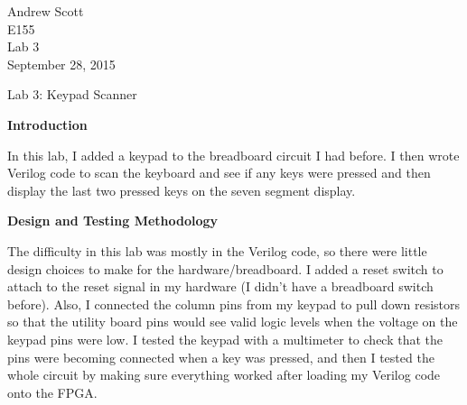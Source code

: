 \documentclass[11pt,letterpaper]{article}
\begin{document}
\begin{flushright}
Andrew Scott\\
E155\\
Lab 3\\
September 28, 2015
\end{flushright}

\begin{center}
Lab 3: Keypad Scanner
\end{center}

\noindent\textbf{Introduction}

In this lab, I added a keypad to the breadboard circuit I had before. I then wrote Verilog code to scan the keyboard and see if any keys were pressed and then display the last two pressed keys on the seven segment display.

\noindent\textbf{Design and Testing Methodology}

The difficulty in this lab was mostly in the Verilog code, so there were little design choices to make for the hardware/breadboard. I added a reset switch to attach to the reset signal in my hardware (I didn't have a breadboard switch before). Also, I connected the column pins from my keypad to pull down resistors so that the utility board pins would see valid logic levels when the voltage on the keypad pins were low. I tested the keypad with a multimeter to check that the pins were becoming connected when a key was pressed, and then I tested the whole circuit by making sure everything worked after loading my Verilog code onto the FPGA.
\end{document}
